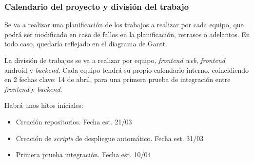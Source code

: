 \documentclass{article}
\begin{document}
\subsubsection{Calendario del proyecto y división del trabajo}

Se va a realizar una planificación de los trabajos a realizar por cada equipo, que
podrá ser modificado en caso de fallos en la planificación, retrasos o
adelantos. En todo caso, quedaría reflejado en el diagrama de Gantt.

La división de trabajos se va a realizar por equipo, \textit{frontend web},
\textit{frontend} android y \textit{backend}. Cada equipo tendrá su propio calendario interno, coincidiendo en 2 fechas clave:
14 de abril, para una primera prueba de integración entre \textit{frontend} y \textit{backend}.

Habrá unos hitos iniciales:
\begin{itemize}
    \item Creación repositorios. Fecha est. 21/03
    \item Creación de \textit{scripts} de despliegue automático. Fecha est. 31/03
    \item Primera prueba integración. Fecha est. 10/04
\end{itemize}
\end{document}
